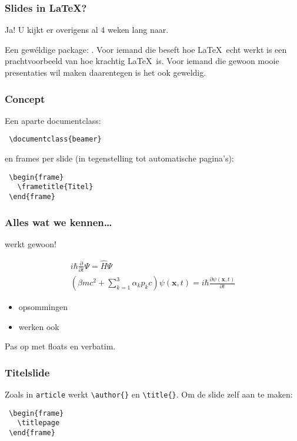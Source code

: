 \begin{frame}
  \frametitle{Slides in \LaTeX?}

  Ja! U kijkt er overigens al 4 weken lang naar.

  Een gew\'eldige package: . Voor iemand die beseft hoe \LaTeX\ echt werkt is  een prachtvoorbeeld van hoe krachtig \LaTeX\ is. Voor iemand die gewoon mooie presentaties wil maken daarentegen is het ook geweldig.
\end{frame}

\begin{frame}[fragile]
  \frametitle{Concept}

  Een aparte documentclass:

  \begin{verbatim}
 \documentclass{beamer}
  \end{verbatim}

  en frames per slide (in tegenstelling tot automatische pagina's):
  \begin{verbatim}
 \begin{frame}
   \frametitle{Titel}
 \end{frame}
  \end{verbatim}
\end{frame}

\begin{frame}
  \frametitle{Alles wat we kennen\ldots}

  \small
  werkt gewoon!

  \begin{gather}
    i\hbar\frac{\partial}{\partial t}\Psi=\hat{H}\Psi \\
    \left( \beta mc^2+\sum_{k=1}^3\alpha_k p_k c \right)\psi(\mathbf{x},t)=i\hbar\frac{\partial\psi(\mathbf{x},t)}{\partial t}
  \end{gather}

  \begin{itemize}
    \item opsommingen
    \item werken ook
  \end{itemize}

  Pas op met floats en verbatim.
\end{frame}

\begin{frame}[fragile]
  \frametitle{Titelslide}

  Zoals in \verb|article| werkt \verb|\author{}| en \verb|\title{}|. Om de slide zelf aan te maken:
  \begin{verbatim}
 \begin{frame}
   \titlepage
 \end{frame}
\end{verbatim}
\end{frame}

